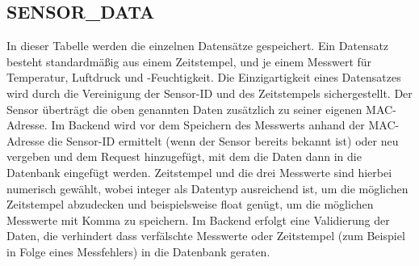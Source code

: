 \subsection*{SENSOR\_DATA}
In dieser Tabelle werden die einzelnen Datensätze gespeichert. Ein Datensatz besteht standardmäßig aus einem Zeitstempel, und je einem Messwert für Temperatur, Luftdruck und -Feuchtigkeit. Die Einzigartigkeit eines Datensatzes wird durch die Vereinigung der Sensor-ID und des Zeitstempels sichergestellt. Der Sensor überträgt die oben genannten Daten zusätzlich zu seiner eigenen MAC-Adresse. Im Backend wird vor dem Speichern des Messwerts anhand der MAC-Adresse die Sensor-ID ermittelt (wenn der Sensor bereits bekannt ist) oder neu vergeben und dem Request hinzugefügt, mit dem die Daten dann in die Datenbank eingefügt werden. Zeitstempel und die drei Messwerte sind hierbei numerisch gewählt, wobei integer als Datentyp ausreichend ist, um die möglichen Zeitstempel abzudecken und beispielsweise float genügt, um die möglichen Messwerte mit Komma zu speichern. Im Backend erfolgt eine Validierung der Daten, die verhindert dass verfälschte Messwerte oder Zeitstempel (zum Beispiel in Folge eines Messfehlers) in die Datenbank geraten.\\